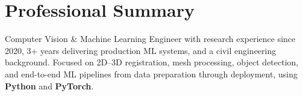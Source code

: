 \titlespacing*{\section}{0pt}{4pt}{4pt}



\section{Professional Summary}
Computer Vision \& Machine Learning Engineer with research experience since 2020, 3+ years delivering production ML systems, and a civil engineering background. Focused on 2D--3D registration, mesh processing, object detection, and end-to-end ML pipelines from data preparation through deployment, using \textbf{Python} and \textbf{PyTorch}.

